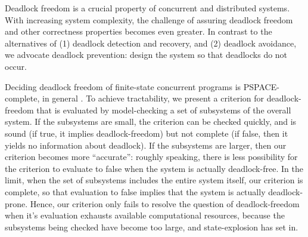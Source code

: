 

Deadlock freedom is a crucial property of concurrent and distributed systems. With increasing system
complexity, the challenge of assuring deadlock freedom and other correctness properties becomes even
greater.  In contrast to the alternatives of (1) deadlock detection and recovery, and (2) deadlock
avoidance, we advocate deadlock prevention: design the system so that deadlocks do not occur.

Deciding deadlock freedom of finite-state concurrent programs is PSPACE-complete, in general
\cite[chapter 19]{papadimitriou1994computational}. To achieve tractability, we present a criterion
for deadlock-freedom that is evaluated by model-checking a set of subsystems of the overall
system. If the subsystems are small, the criterion can be checked quickly, and is sound (if
true, it implies deadlock-freedom) but not complete (if false, then it yields no information about
deadlock). If the subsystems are larger, then our criterion becomes more ``accurate'': roughly
speaking, there is less possibility for the criterion to evaluate to false when the system is
actually deadlock-free. In the limit, when the set of subsystems includes the entire system itself,
our criterion is complete, so that evaluation to false implies that the system is actually
deadlock-prone. Hence, our criterion only fails to resolve the question of deadlock-freedom 
when it's evaluation exhausts available computational resources, because
the subsystems being checked have become too large, and state-explosion has set in.

